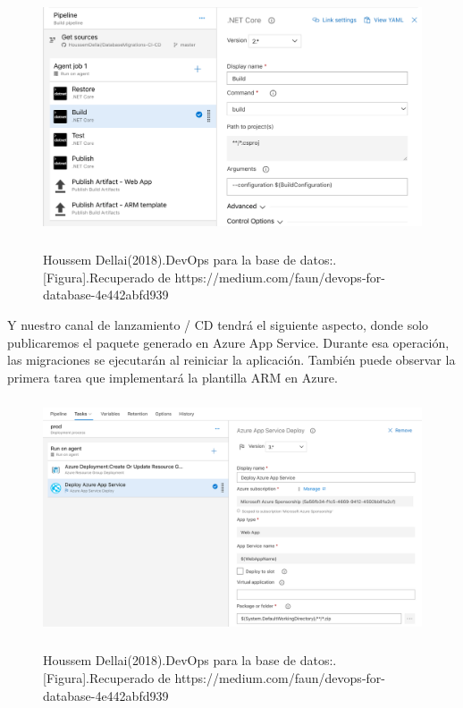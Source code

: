 \documentclass[preprint,12pt]{elsarticle}
\begin{document}
	\begin{figure}[H]
			\begin{center}
					\includegraphics[width=12cm,height=7cm]{./IMAGENES/analisis2}
			\end{center}
			Houssem Dellai(2018).DevOps para la base de datos:.[Figura].Recuperado de 
https://medium.com/faun/devops-for-database-4e442abfd939
		\end{figure}

	Y nuestro canal de lanzamiento / CD tendrá el siguiente aspecto, donde solo publicaremos el paquete generado en Azure App Service. Durante esa operación, las migraciones se ejecutarán al reiniciar la aplicación. También puede observar la primera tarea que implementará la plantilla ARM en Azure.

	\begin{figure}[H]
			\begin{center}
					\includegraphics[width=12cm,height=7cm]{./IMAGENES/analisis3}
			\end{center}
			Houssem Dellai(2018).DevOps para la base de datos:.[Figura].Recuperado de 
https://medium.com/faun/devops-for-database-4e442abfd939
		\end{figure}
\end{document}

